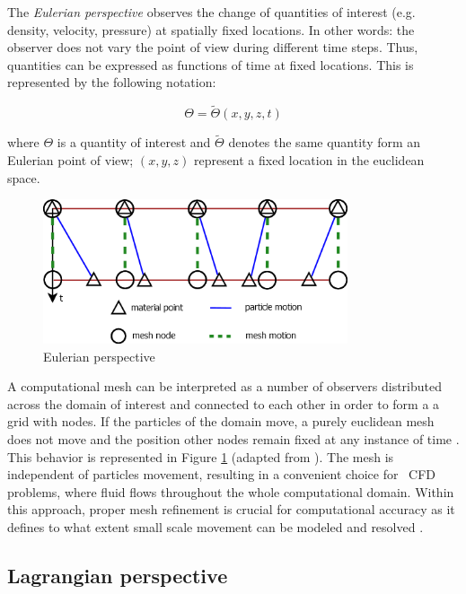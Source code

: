The \textit{Eulerian perspective} observes the change of quantities of interest (e.g. density, velocity, pressure) at spatially fixed locations. In other words: the observer does not vary the point of view during different time steps. Thus, quantities can be expressed as functions of time at fixed locations. 
This is represented by the following notation:

\begin{equation}
	\Theta = \tilde{\Theta}(x,y,z,t)
	\label{eq:eulerian}
\end{equation}

where $\Theta$ is a quantity of interest and $\tilde{\Theta}$ denotes the same quantity form an Eulerian point of view; $(x, y, z)$ represent a fixed location in the euclidean space.


\begin{figure}[htbp!]
	\centering
	\includegraphics[width=0.8\textwidth]{images/eulerian}
	\caption{Eulerian perspective}
	\label{fig:eulerian}
\end{figure}

A computational mesh can be interpreted as a number of observers distributed across the domain of interest and connected to each other in order to form a a grid with nodes. If the particles of the domain move, a purely euclidean mesh does not move and the position other nodes remain fixed at any instance of time \cite{Cheng2006SlidingFL}. 
This behavior is represented in Figure \ref{fig:eulerian} (adapted from \cite{Cheng2006SlidingFL}). The mesh is independent of particles movement, resulting in a convenient choice for ~\ac{CFD} problems, where fluid flows throughout the whole
computational domain. Within this approach, proper mesh refinement is crucial for computational accuracy as it defines to what extent small scale movement can be modeled and resolved \cite{donea2017arbitrary}.

\subsection{Lagrangian perspective}
\label{subsec:lagrange}

